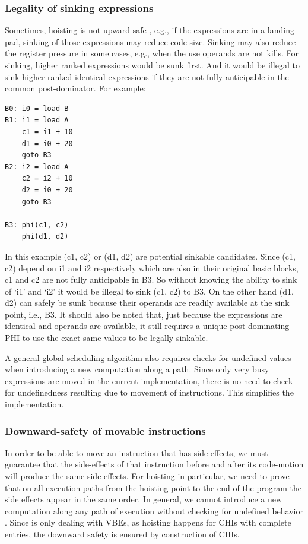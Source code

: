 \documentclass[sigplan,10pt,review,anonymous]{acmart}\settopmatter{printfolios=true,printccs=false,printacmref=false}
\begin{document}
\subsubsection{Legality of sinking expressions}
\label{subsec:legality-sink}
Sometimes, hoisting is not upward-safe \cite{click1995global}, e.g., if the
expressions are in a landing pad, sinking of those expressions
may reduce code size. Sinking may also reduce the register pressure in some
cases, e.g., when the use operands are not kills. For sinking, higher ranked
expressions would be sunk first. And it would be illegal to sink higher ranked
identical expressions if they are not fully anticipable in the common
post-dominator. For example:

\begin{verbatim}
B0: i0 = load B
B1: i1 = load A
    c1 = i1 + 10
    d1 = i0 + 20
    goto B3
B2: i2 = load A
    c2 = i2 + 10
    d2 = i0 + 20
    goto B3

B3: phi(c1, c2)
    phi(d1, d2)
\end{verbatim}

In this example (c1, c2) or (d1, d2) are potential sinkable candidates. Since
(c1, c2) depend on i1 and i2 respectively which are also in their original basic
blocks, c1 and c2 are not fully anticipable in B3. So without knowing the ability to sink
of `i1' and `i2' it would be illegal to sink (c1, c2) to B3. On the other hand
(d1, d2) can safely be sunk because their operands are readily available at the
sink point, i.e., B3. It should also be noted that, just because the expressions
are identical and operands are available, it still requires a unique
post-dominating PHI to use the exact same values to be legally sinkable.

A general global scheduling algorithm also requires checks for undefined values
when introducing a new computation along a path. Since only very busy
expressions are moved in the current implementation, there is no need to check
for undefinedness resulting due to movement of instructions. This simplifies the
implementation.


\subsubsection{Downward-safety of movable instructions}

In order to be able to move an instruction that has side effects, we must
guarantee that the side-effects of that instruction before and after its
code-motion will produce the same side-effects.  For hoisting in particular, we
need to prove that on all execution paths from the hoisting point to the end of
the program the side effects appear in the same order. In general, we cannot
introduce a new computation along any path of execution without checking for
undefined behavior \cite{undef}. Since \GCM{} is only dealing with VBEs, as
hoisting happens for CHIs with complete entries, the downward safety is ensured
by construction of CHIs.
\end{document}
